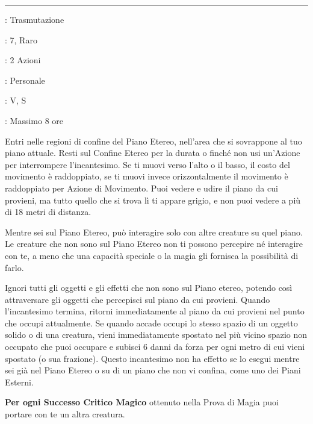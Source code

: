\begin{multicols}{2}
\smallskip\noindent\rule{\linewidth}{2pt} \hypertarget{Forma Eterea}{}\smallskip{}
\noindent
\begin{description}[noitemsep, topsep=0pt, parsep=0pt, partopsep=0pt, leftmargin=0cm, labelwidth=2.8cm]
	\item[\textbf{Lista di Magia}]: Trasmutazione
	\item[\textbf{Livello}]: 7, Raro
	\item[\textbf{T. di Lancio}]: 2 Azioni
	\item[\textbf{Gittata}]: Personale
	\item[\textbf{Componenti}]: V, S
	\item[\textbf{Durata}]: Massimo 8 ore
\end{description}

Entri nelle regioni di confine del Piano Etereo, nell'area che si sovrappone al tuo piano attuale. Resti sul Confine Etereo per la durata o finché non usi un'Azione per interrompere l'incantesimo. Se ti muovi verso l'alto o il basso, il costo del movimento è raddoppiato, se ti muovi invece orizzontalmente il movimento è raddoppiato per Azione di Movimento. Puoi vedere e udire il piano da cui provieni, ma tutto quello che si trova lì ti appare grigio, e non puoi vedere a più di 18 metri di distanza.

Mentre sei sul Piano Etereo, può interagire solo con altre creature su quel piano. Le creature che non sono sul Piano Etereo non ti possono percepire né interagire con te, a meno che una capacità speciale o la magia gli fornisca la possibilità di farlo.

Ignori tutti gli oggetti e gli effetti che non sono sul Piano etereo, potendo così attraversare gli oggetti che percepisci sul piano da cui provieni. Quando l'incantesimo termina, ritorni immediatamente al piano da cui provieni nel punto che occupi attualmente. Se quando accade occupi lo stesso spazio di un oggetto solido o di una creatura, vieni immediatamente spostato nel più vicino spazio non occupato che puoi occupare e subisci 6 danni da forza per ogni metro di cui vieni spostato (o sua frazione). Questo incantesimo non ha effetto se lo esegui mentre sei già nel Piano Etereo o su di un piano che non vi confina, come uno dei Piani Esterni.

\textbf{Per ogni Successo Critico Magico} ottenuto nella Prova di Magia puoi portare con te un altra creatura.


\end{multicols}
